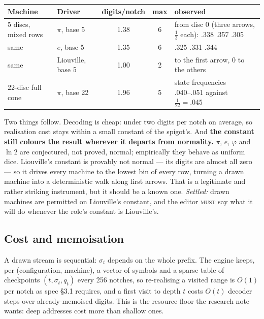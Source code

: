\documentclass[11pt,a4paper]{article}
\newcommand{\MUST}{\textsc{must}}
\theoremstyle{definition}
\theoremstyle{plain}
\theoremstyle{remark}
\begin{document}
\begin{center}
\begin{tabular}{llcc>{\raggedright\arraybackslash}p{4.3cm}}
\toprule
\textbf{Machine} & \textbf{Driver} & \textbf{digits/notch} & \textbf{max} & \textbf{observed} \\
\midrule
5 discs, mixed rows & $\pi$, base 5 & 1.38 & 6 & from disc 0 (three arrows, $\tfrac13$ each): .338 .357 .305 \\
same & $e$, base 5 & 1.35 & 6 & .325 .331 .344 \\
same & Liouville, base 5 & 1.00 & 2 & 1.000 to the first arrow, 0 to the others \\
22-disc full cone & $\pi$, base 22 & 1.96 & 5 & state frequencies .040--.051 against $\tfrac1{22}=.045$ \\
\bottomrule
\end{tabular}
\end{center}

Two things follow. Decoding is cheap: under two digits per notch on average, so realisation cost
stays within a small constant of the spigot's. And \textbf{the constant still colours the result
wherever it departs from normality.} $\pi$, $e$, $\varphi$ and $\ln 2$ are conjectured, not proved,
normal; empirically they behave as uniform dice. Liouville's constant is provably not normal --- its
digits are almost all zero --- so it drives every machine to the lowest bin of every row, turning a
drawn machine into a deterministic walk along first arrows. That is a legitimate and rather striking
instrument, but it should be a known one. \emph{Settled:} drawn machines are permitted on
Liouville's constant, and the editor \MUST{} say what it will do whenever the role's constant is
Liouville's.

\subsection{Cost and memoisation}

A drawn stream is sequential: $\sigma_t$ depends on the whole prefix. The engine keeps, per
(configuration, machine), a vector of symbols and a sparse table of checkpoints $(t,\sigma_t,q_t)$
every 256 notches, so re-realising a visited range is $O(1)$ per notch as spec \S3.1 requires, and a
first visit to depth $t$ costs $O(t)$ decoder steps over already-memoised digits. This is the
resource floor the research note wants: deep addresses cost more than shallow ones.

\end{document}
